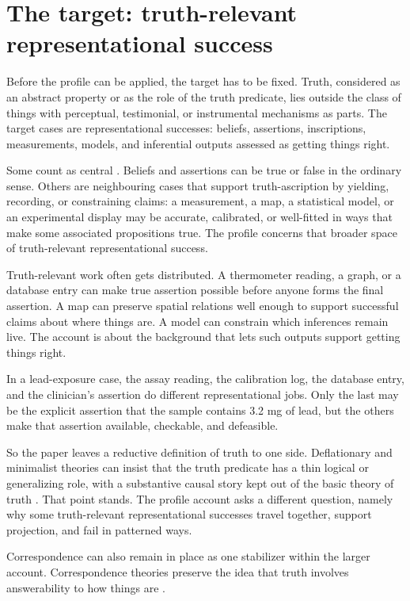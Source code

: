 \documentclass[12pt]{article}
\begin{document}
\section{The target: truth-relevant representational success}\label{sec:target}

Before the profile can be applied, the target has to be fixed. Truth, considered as an
abstract property or as the role of the truth predicate, lies outside the class of things
with perceptual, testimonial, or instrumental mechanisms as parts. The target cases are
representational successes: beliefs, assertions, inscriptions, measurements, models, and
inferential outputs assessed as getting things right.

Some count as central . Beliefs and assertions can be true or
false in the ordinary sense. Others are neighbouring cases that support truth-ascription
by yielding, recording, or constraining claims: a measurement, a map, a statistical
model, or an experimental display may be accurate, calibrated, or well-fitted in ways
that make some associated propositions true. The profile concerns that broader space of
truth-relevant representational success.

Truth-relevant work often gets distributed. A thermometer reading, a graph, or a database
entry can make true assertion possible before anyone
forms the final assertion. A map can preserve spatial relations well enough to support
successful claims about where things are. A model can constrain which inferences remain
live. The account is about the background that lets such outputs support getting things
right.

In a lead-exposure case, the assay reading, the calibration log, the database entry, and
the clinician's assertion do different representational jobs. Only the last may be the
explicit assertion that the sample contains 3.2 mg of lead, but the others make that
assertion available, checkable, and defeasible.

So the paper leaves a reductive definition of truth to one side. Deflationary
and minimalist theories can insist that the truth predicate has a
thin logical or generalizing role, with a substantive causal story kept out of the basic
theory of truth \citep{horwich_1998_truth}. That point stands. The
profile account asks a different question, namely why some truth-relevant representational
successes travel together, support projection, and fail in patterned ways.

Correspondence can also remain in place as one stabilizer within the larger account.
Correspondence theories preserve the idea
that truth involves answerability to how things are
\citep{david_1994_correspondence_disquotation,kirkham_1992_theories_truth}.
\end{document}
